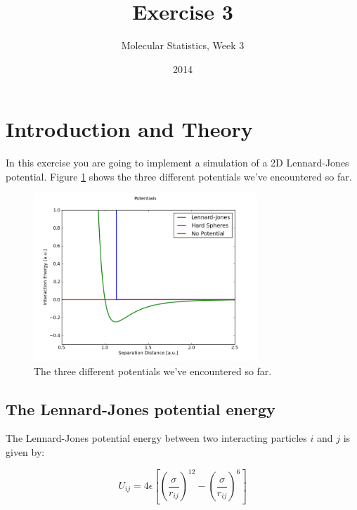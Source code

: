 \documentclass{article}
\title{Exercise 3}
\author{Molecular Statistics, Week 3}
\date{2014}
\begin{document}

\maketitle


\section{Introduction and Theory}

In this exercise you are going to implement a simulation of a 2D Lennard-Jones
potential. Figure \ref{fig:potentials} shows the three different potentials
we've encountered so far.

    \begin{figure}[h!]
    \begin{center}
        \includegraphics[width=0.75\textwidth]{potentials.png}
        \caption{The three different potentials we've encountered so far.}
        \label{fig:potentials}
    \end{center}
    \end{figure}


\subsection{The Lennard-Jones potential energy}

The Lennard-Jones potential energy between two interacting particles $i$ and
$j$ is given by:

\begin{equation}
    U_{ij} = 4 \epsilon \left[ \left(\frac{\sigma}{r_{ij}} \right)^{12} - \left(\frac{\sigma}{r_{ij}} \right)^6 \right]
\end{equation}
\end{document}
